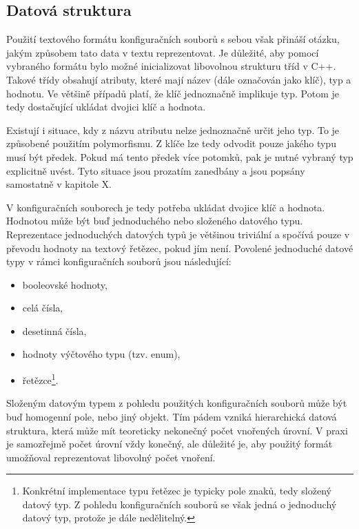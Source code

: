 \documentclass[FM,bw,DP]{tulthesis}
\begin{document}
\subsection{Datová struktura}

Použití textového formátu konfiguračních souborů s sebou však přináší otázku, jakým způsobem tato data v textu reprezentovat. Je důležité, aby pomocí vybraného formátu bylo možné inicializovat libovolnou strukturu tříd v C++. Takové třídy obsahují atributy, které mají název (dále označován jako klíč), typ a hodnotu. Ve většině případů platí, že klíč jednoznačně implikuje typ. Potom je tedy dostačující ukládat dvojici klíč a hodnota.

Existují i situace, kdy z názvu atributu nelze jednoznačně určit jeho typ. To je způsobené použitím polymorfismu. Z klíče lze tedy odvodit pouze jakého typu musí být předek. Pokud má tento předek více potomků, pak je nutné vybraný typ explicitně uvést. Tyto situace jsou prozatím zanedbány a jsou popsány samostatně v kapitole X.

V konfiguračních souborech je tedy potřeba ukládat dvojice klíč a hodnota. Hodnotou může být buď jednoduchého nebo složeného datového typu. Reprezentace jednoduchých datových typů je většinou triviální a spočívá pouze v převodu hodnoty na textový řetězec, pokud jím není. Povolené jednoduché datové typy v rámci konfiguračních souborů jsou následující:

\begin{itemize}
	\item booleovské hodnoty, %
	\item celá čísla,
	\item desetinná čísla,
	\item hodnoty výčtového typu (tzv. enum),
	\item řetězce\footnote{Konkrétní implementace typu řetězec je typicky pole znaků, tedy složený datový typ. Z pohledu konfiguračních souborů se však jedná o jednoduchý datový typ, protože je dále nedělitelný.}.
\end{itemize}

Složeným datovým typem z pohledu použitých konfiguračních souborů může být buď homogenní pole, nebo jiný objekt. Tím pádem vzniká hierarchická datová struktura, která může mít teoreticky nekonečný počet vnořených úrovní. V praxi je samozřejmě počet úrovní vždy konečný, ale důležité je, aby použitý formát umožňoval reprezentovat libovolný počet vnoření.
\end{document}
